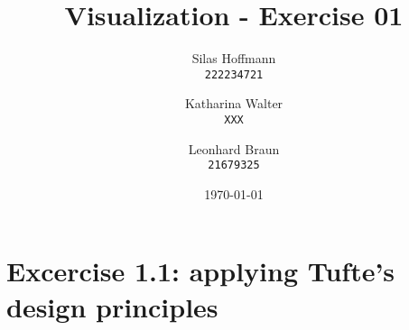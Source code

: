 \documentclass[a4paper]{article}
\title{Visualization - Exercise 01}
\author{
    Silas Hoffmann \\
    \texttt{222234721}
    \and
    Katharina Walter \\
    \texttt{XXX}
    \and
    Leonhard Braun \\
    \texttt{21679325}
}
\date{\today}
\begin{document}
    \maketitle


    \section{Excercise 1.1: applying Tufte's design principles}
\end{document}
